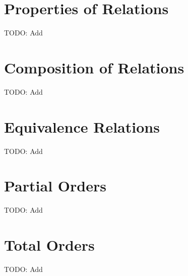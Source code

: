\section{Properties of Relations}
TODO: Add


\section{Composition of Relations}
TODO: Add


\section{Equivalence Relations}
TODO: Add


\section{Partial Orders}  %
TODO: Add


\section{Total Orders}  %
TODO: Add

